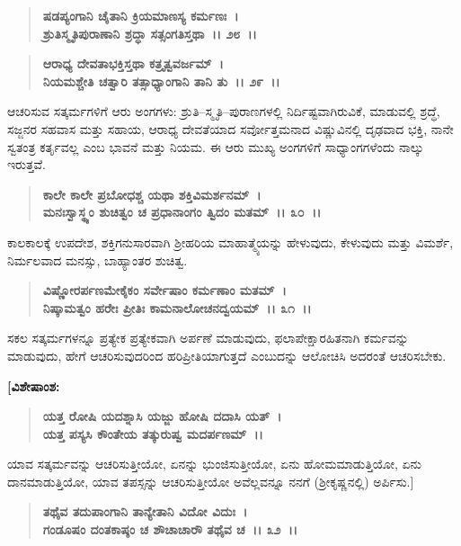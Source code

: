 \begin{verse}
\textbf{ಷಡಪ್ಯಂಗಾನಿ ಚೈತಾನಿ ಕ್ರಿಯಮಾಣಸ್ಯ ಕರ್ಮಣಃ~।}\\\textbf{ಶ್ರುತಿಸ್ಮೃತಿಪುರಾಣಾನಿ ಶ್ರದ್ಧಾ ಸತ್ಸಂಗತಿಸ್ತಥಾ~।। ೨೮~।। }
\end{verse}

\begin{verse}
\textbf{ಆರಾಧ್ಯ ದೇವತಾಭಕ್ತಿಸ್ತಥಾ ಕತ್ರೃತ್ವವರ್ಜಮ್~।}\\\textbf{ನಿಯಮಶ್ಚೇತಿ ಚತ್ವಾರಿ ತತ್ಸಾಧ್ಯಾಂಗಾನಿ ತಾನಿ ತು~।। ೨೯~।।}
\end{verse}

ಆಚರಿಸುವ ಸತ್ಕರ್ಮಗಳಿಗೆ ಆರು ಅಂಗಗಳು: ಶ್ರುತಿ–ಸ್ಮೃತಿ–ಪುರಾಣಗಳಲ್ಲಿ ನಿರ್ದಿಷ್ಟವಾಗಿರುವಿಕೆ, ಮಾಡುವಲ್ಲಿ ಶ್ರದ್ಧೆ, ಸಜ್ಜನರ ಸಹವಾಸ ಮತ್ತು ಸಹಾಯ, ಆರಾಧ್ಯ ದೇವತೆಯಾದ ಸರ್ವೋತ್ತಮನಾದ ವಿಷ್ಣುವಿನಲ್ಲಿ ದೃಢವಾದ ಭಕ್ತಿ, ನಾನೇ ಸ್ವತಂತ್ರ ಕರ್ತೃವಲ್ಲ ಎಂಬ ಭಾವನೆ ಮತ್ತು ನಿಯಮ. ಈ ಆರು ಮುಖ್ಯ ಅಂಗಗಳಿಗೆ ಸಾಧ್ಯಾಂಗಗಳೆಂದು ನಾಲ್ಕು ಇರುತ್ತವೆ.

\begin{verse}
\textbf{ಕಾಲೇ ಕಾಲೇ ಪ್ರಬೋಧಶ್ಚ ಯಥಾ ಶಕ್ತಿವಿಮರ್ಶನಮ್~।}\\\textbf{ಮನಃಸ್ವಾಸ್ಥ್ಯಂ ಶುಚಿತ್ವಂ ಚ ಪ್ರಧಾನಾಂಗಂ ತ್ವಿದಂ ಮತಮ್~।। ೩೦~।।}
\end{verse}

ಕಾಲಕಾಲಕ್ಕೆ ಉಪದೇಶ, ಶಕ್ತಿಗನುಸಾರವಾಗಿ ಶ‍್ರೀಹರಿಯ ಮಾಹಾತ್ಮ್ಯೆಯನ್ನು ಹೇಳುವುದು, ಕೇಳುವುದು ಮತ್ತು ವಿಮರ್ಶೆ, ನಿರ್ಮಲವಾದ ಮನಸ್ಸು, ಬಾಹ್ಯಾಂತರ ಶುಚಿತ್ವ.

\begin{verse}
\textbf{ವಿಷ್ಣೋರರ್ಪಣಮೇಕೈಕಂ ಸರ್ವೇಷಾಂ ಕರ್ಮಣಾಂ ಮತಮ್~।}\\\textbf{ನಿಷ್ಕಾಮತ್ವಂ ಹರೇಃ ಪ್ರೀತಿಃ ಕಾಮನಾಲೋಚನದ್ವಯಮ್~।। ೩೧~।।}
\end{verse}

ಸಕಲ ಸತ್ಕರ್ಮಗಳನ್ನೂ ಪ್ರತ್ಯೇಕ ಪ್ರತ್ಯೇಕವಾಗಿ ಅರ್ಪಣೆ ಮಾಡುವುದು, ಫಲಾಪೇಕ್ಷಾರಹಿತನಾಗಿ ಕರ್ಮವನ್ನು ಮಾಡುವುದು, ಹೇಗೆ ಆಚರಿಸುವುದರಿಂದ ಹರಿಪ್ರೀತಿಯಾಗುತ್ತದೆ ಎಂಬುದನ್ನು ಆಲೋಚಿಸಿ ಅದರಂತೆ ಆಚರಿಸಬೇಕು.

\begin{flushleft}
\textbf{[ವಿಶೇಷಾಂಶ:}
\end{flushleft}

\begin{verse}
\textbf{ಯತ್ತ ರೋಷಿ ಯದಶ್ನಾಸಿ ಯಜ್ಜು ಹೋಷಿ ದದಾಸಿ ಯತ್~।}\\\textbf{ಯತ್ತ ಪಸ್ಯಸಿ ಕೌಂತೇಯ ತತ್ಕುರುಷ್ವ ಮದರ್ಪಣಮ್~।।} 
\end{verse}

ಯಾವ ಸತ್ಕರ್ಮವನ್ನು ಆಚರಿಸುತ್ತೀಯೋ, ಏನನ್ನು ಭುಂಜಿಸುತ್ತೀಯೋ, ಏನು ಹೋಮಮಾಡುತ್ತಿಯೋ, ಏನು ದಾನಮಾಡುತ್ತಿಯೋ, ಯಾವ ತಪಸ್ಸನ್ನು ಆಚರಿಸುತ್ತೀಯೋ ಅವೆಲ್ಲವನ್ನೂ ನನಗೆ (ಶ‍್ರೀಕೃಷ್ಣನಲ್ಲಿ) ಅರ್ಪಿಸು.]

\begin{verse}
\textbf{ತಥೈವ ತದುಪಾಂಗಾನಿ ತಾನ್ಯೇತಾನಿ ವಿದೋ ವಿದುಃ~।}\\\textbf{ಗಂಡೂಷಂ ದಂತಕಾಷ್ಠಂ ಚ ಶೌಚಾಚಾರೌ ತಥೈವ ಚ~।। ೩೨~।।}
\end{verse}

